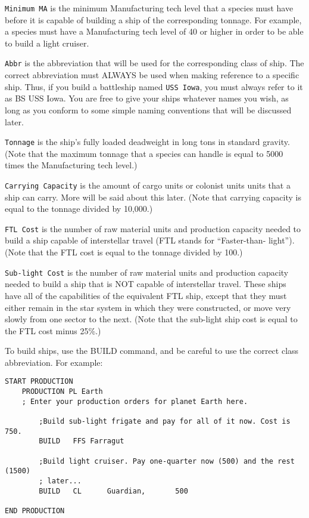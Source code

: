 \documentclass[10pt,titlepage]{article}
\begin{document}
\begin{verbatim}

\end{verbatim}
\texttt{Minimum MA} is the minimum Manufacturing tech level that a species must have
before it is capable of building a ship of the corresponding tonnage.  For
example, a species must have a Manufacturing tech level of 40 or higher in
order to be able to build a light cruiser.

\texttt{Abbr} is the abbreviation that will be used for the corresponding class of
ship.  The correct abbreviation must ALWAYS be used when making reference to
a specific ship.  Thus, if you build a battleship named \texttt{USS Iowa}, you must
always refer to it as BS USS Iowa.  You are free to give your ships whatever
names you wish, as long as you conform to some simple naming conventions that
will be discussed later.

\texttt{Tonnage} is the ship's fully loaded deadweight in long tons in standard
gravity.  (Note that the maximum tonnage that a species can handle is equal
to 5000 times the Manufacturing tech level.)

\texttt{Carrying Capacity} is the amount of cargo units or colonist units units that
a ship can carry.  More will be said about this later.  (Note that carrying
capacity is equal to the tonnage divided by 10,000.)

\texttt{FTL Cost} is the number of raw material units and production capacity needed
to build a ship capable of interstellar travel (FTL stands for ``Faster-than-
light'').  (Note that the FTL cost is equal to the tonnage divided by 100.)

\texttt{Sub-light Cost} is the number of raw material units and production capacity
needed to build a ship that is NOT capable of interstellar travel.  These ships
have all of the capabilities of the equivalent FTL ship, except that they must
either remain in the star system in which they were constructed, or move very
slowly from one sector to the next.  (Note that the sub-light ship cost is
equal to the FTL cost minus 25\%.)

To build ships, use the BUILD command, and be careful to use the correct class
abbreviation.  For example:
\begin{verbatim}
START PRODUCTION
    PRODUCTION PL Earth
    ; Enter your production orders for planet Earth here.

        ;Build sub-light frigate and pay for all of it now. Cost is 750.
        BUILD   FFS Farragut

        ;Build light cruiser. Pay one-quarter now (500) and the rest (1500)
        ; later...
        BUILD   CL      Guardian,       500

END PRODUCTION
\end{verbatim}
\end{document}
